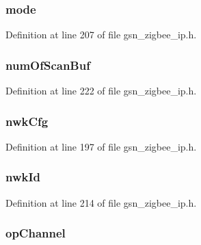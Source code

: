 \hypertarget{a00440_a7d61d79fa98a45545166420dec0d8f3d}{
\subsubsection[{mode}]{ {\bf mode}}}
\label{a00440_a7d61d79fa98a45545166420dec0d8f3d}


Definition at line 207 of file gsn\_\-zigbee\_\-ip.h.

\hypertarget{a00440_af6f0a9ed6e907cc254f87be7ffb7cd4c}{
\subsubsection[{numOfScanBuf}]{ {\bf numOfScanBuf}}}
\label{a00440_af6f0a9ed6e907cc254f87be7ffb7cd4c}


Definition at line 222 of file gsn\_\-zigbee\_\-ip.h.

\hypertarget{a00440_a97bc48ebc9b6cd9d2cf5f4eaafe7a6d6}{
\subsubsection[{nwkCfg}]{ {\bf nwkCfg}}}
\label{a00440_a97bc48ebc9b6cd9d2cf5f4eaafe7a6d6}


Definition at line 197 of file gsn\_\-zigbee\_\-ip.h.

\hypertarget{a00440_aa09adf9d6455e0d08084e30083a043cd}{
\subsubsection[{nwkId}]{ {\bf nwkId}}}
\label{a00440_aa09adf9d6455e0d08084e30083a043cd}


Definition at line 214 of file gsn\_\-zigbee\_\-ip.h.

\hypertarget{a00440_ace13daabd3fb488dad3214e143d79cf0}{
\subsubsection[{opChannel}]{ {\bf opChannel}}}
\label{a00440_ace13daabd3fb488dad3214e143d79cf0}


